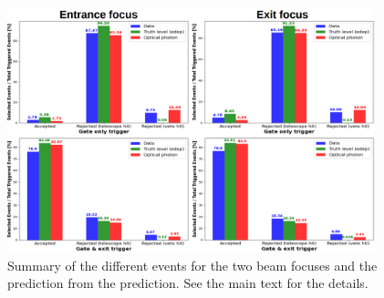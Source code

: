 \begin{refsection}
            \begin{figure}
                \centering
                \includegraphics[width = 0.95\textwidth]{Figures/muEDM_Nov2022/shanghai_summary.png}
                \caption[]{Summary of the different events for the two beam focuses and the prediction from the \gfb prediction. See the main text for the details.}
                \label{fig:muEDM:bt2022:summary}
            \end{figure}


\end{refsection}
